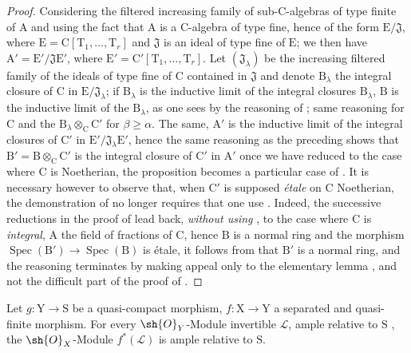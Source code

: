 \begin{proof}
Considering the filtered increasing family of sub-$\mathrm{C}$-algebras of type finite of $\mathrm{A}$ and using the fact that $\mathrm{A}$ is a $\mathrm{C}$-algebra of type fine, hence of the form $\mathrm{E}/\mathfrak{J}$, where $\mathrm{E}=\mathrm{C}[\mathrm{T}_1,\ldots,\mathrm{T}_r]$ and $\mathfrak{J}$ is an ideal of type fine of $\mathrm{E}$; we then have $\mathrm{A}'=\mathrm{E}'/\mathfrak{J}\mathrm{E}'$, where $\mathrm{E}'=\mathrm{C}'[\mathrm{T}_1,\ldots,\mathrm{T}_r]$.
Let $(\mathfrak{J}_\lambda)$ be the increasing filtered family of the ideals of type fine of $\mathrm{C}$ contained in $\mathfrak{J}$ and denote $\mathrm{B}_\lambda$ the integral closure of $\mathrm{C}$ in $\mathrm{E}/\mathfrak{J}_\lambda$; if $\mathrm{B}_\lambda$ is the inductive limit of the integral closures $\mathrm{B}_\lambda$, $\mathrm{B}$ is the inductive limit of the $\mathrm{B}_\lambda$, as one sees by the reasoning of ; same reasoning for $\mathrm{C}$ and the $\mathrm{B}_\lambda\otimes_\mathrm{C}\mathrm{C}'$ for $\beta\geq\alpha$.
The same, $\mathrm{A}'$ is the inductive limit of the integral closures of $\mathrm{C}'$ in $\mathrm{E}'/\mathfrak{J}_\lambda\mathrm{E}'$, hence the same reasoning as the preceding shows that $\mathrm{B}'=\mathrm{B}\otimes_\mathrm{C}\mathrm{C}'$ is the integral closure of $\mathrm{C}'$ in $\mathrm{A}'$ once we have reduced to the case where $\mathrm{C}$ is Noetherian, the proposition becomes a particular case of .
It is necessary however to observe that, when $\mathrm{C}'$ is supposed \emph{\'etale} on $\mathrm{C}$ Noetherian, the demonstration of  no longer requires that one use .
Indeed, the successive reductions in the proof of  lead back, \emph{without using} , to the case where $\mathrm{C}$ is \emph{integral}, $\mathrm{A}$ the field of fractions of $\mathrm{C}$, hence $\mathrm{B}$ is a normal ring and the morphism $\operatorname{Spec}(\mathrm{B}')\to\operatorname{Spec}(\mathrm{B})$ is \'etale, it follows from  that $\mathrm{B}'$ is a normal ring, and the reasoning terminates by making appeal only to the elementary lemma , and not the difficult part of the proof of .
\end{proof}

\begin{proposition}[18.12.16]
\label{IV.18.12.16}
Let $g:\mathrm{Y}\to\mathrm{S}$ be a quasi-compact morphism, $f:\mathrm{X}\to\mathrm{Y}$ a separated and quasi-finite morphism.
For every $\sh{O}_Y$-Module invertible $\mathscr{L}$, ample relative to $\mathrm{S}$ , the $\sh{O}_X$-Module $f^*(\mathscr{L})$ is ample relative to $\mathrm{S}$.
\end{proposition}

